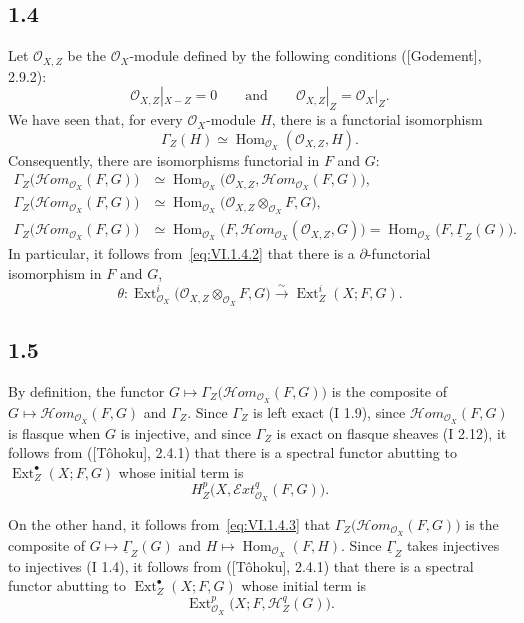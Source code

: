 \documentclass[11pt,a4paper]{article}
\newcommand{\OX}{\mathcal O_X}
\newcommand{\OoXZ}{\mathcal O_{X,Z}}
\newcommand{\Ext}{\operatorname{Ext}}
\newcommand{\Homop}{\operatorname{Hom}}
\newcommand{\SheafExt}{\mathcal E\!xt}
\newcommand{\SheafHom}{\mathcal H\!om}
\newcommand{\SheafGamma}{\underline{\Gamma}}
\newcommand{\SheafH}{\mathcal H}
\begin{document}
\subsection*{1.4}
Let $\OoXZ$ be the $\OX$-module defined by the following conditions
\textup{([Godement], 2.9.2)}:
\[
 \OoXZ|_{X-Z}=0
 \qquad\text{and}\qquad
 \OoXZ|_Z=\OX|_Z.
\]
We have seen that, for every $\OX$-module $H$, there is a functorial
isomorphism
\[
 \Gamma_Z(H)\simeq \Homop_{\OX}(\OoXZ,H).
\]
Consequently, there are isomorphisms functorial in $F$ and $G$:
\begin{align}
 \Gamma_Z\bigl(\SheafHom_{\OX}(F,G)\bigr)
  &\simeq \Homop_{\OX}\bigl(\OoXZ,\SheafHom_{\OX}(F,G)\bigr),
  \tag{1.4.1}\label{eq:VI.1.4.1}\\[-0.15em]
 \Gamma_Z\bigl(\SheafHom_{\OX}(F,G)\bigr)
  &\simeq \Homop_{\OX}\bigl(\OoXZ\otimes_{\OX}F,G\bigr),
  \tag{1.4.2}\label{eq:VI.1.4.2}\\[-0.15em]
 \Gamma_Z\bigl(\SheafHom_{\OX}(F,G)\bigr)
  &\simeq \Homop_{\OX}\bigl(F,\SheafHom_{\OX}(\OoXZ,G)\bigr)
   =\Homop_{\OX}\bigl(F,\SheafGamma_Z(G)\bigr).
  \tag{1.4.3}\label{eq:VI.1.4.3}
\end{align}
In particular, it follows from~\eqref{eq:VI.1.4.2} that there is a
$\partial$-functorial isomorphism in $F$ and $G$,
\[
 \theta\colon
 \Ext_{\OX}^{i}\bigl(\OoXZ\otimes_{\OX}F,G\bigr)
 \xrightarrow{\ \sim\ }
 \Ext_Z^{i}(X;F,G).
\]

\subsection*{1.5}
By definition, the functor
$G\longmapsto\Gamma_Z\bigl(\SheafHom_{\OX}(F,G)\bigr)$ is the composite of
$G\longmapsto\SheafHom_{\OX}(F,G)$ and $\Gamma_Z$. Since $\Gamma_Z$ is left
exact \textup{(I 1.9)}, since $\SheafHom_{\OX}(F,G)$ is flasque when $G$ is
injective, and since $\Gamma_Z$ is exact on flasque sheaves \textup{(I 2.12)},
it follows from \textup{([T\^ohoku], 2.4.1)} that there is a spectral functor
abutting to $\Ext_Z^{\bullet}(X;F,G)$ whose initial term is
\[
 H_Z^p\bigl(X,\SheafExt_{\OX}^q(F,G)\bigr).
\]

On the other hand, it follows from~\eqref{eq:VI.1.4.3} that
$\Gamma_Z\bigl(\SheafHom_{\OX}(F,G)\bigr)$ is the composite of
$G\longmapsto\SheafGamma_Z(G)$ and
$H\longmapsto\Homop_{\OX}(F,H)$. Since $\SheafGamma_Z$ takes injectives to
injectives \textup{(I 1.4)}, it follows from \textup{([T\^ohoku], 2.4.1)}
that there is a spectral functor abutting to $\Ext_Z^{\bullet}(X;F,G)$ whose
initial term is
\[
 \Ext_{\OX}^p\bigl(X;F,\SheafH_Z^q(G)\bigr).
\]
\end{document}
